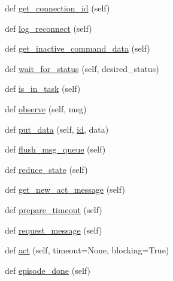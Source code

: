 \begin{DoxyCompactItemize}
\item 
def \hyperlink{classparlai_1_1mturk_1_1core_1_1agents_1_1MTurkAgent_a67b1c261cecdb746af6ce5d545db37ab}{get\+\_\+connection\+\_\+id} (self)
\item 
def \hyperlink{classparlai_1_1mturk_1_1core_1_1agents_1_1MTurkAgent_a989a5ebbfea27129167087af818e4f6d}{log\+\_\+reconnect} (self)
\item 
def \hyperlink{classparlai_1_1mturk_1_1core_1_1agents_1_1MTurkAgent_aa8b6eaf6532f10dabeb1ab8c3de98ec0}{get\+\_\+inactive\+\_\+command\+\_\+data} (self)
\item 
def \hyperlink{classparlai_1_1mturk_1_1core_1_1agents_1_1MTurkAgent_af1a00c6edfe78ac978c5bf97e88bdbe4}{wait\+\_\+for\+\_\+status} (self, desired\+\_\+status)
\item 
def \hyperlink{classparlai_1_1mturk_1_1core_1_1agents_1_1MTurkAgent_a2bf924f7dd6838441403e0045d9a0cd1}{is\+\_\+in\+\_\+task} (self)
\item 
def \hyperlink{classparlai_1_1mturk_1_1core_1_1agents_1_1MTurkAgent_a702f94fe519f05bc8fb9b382b818112c}{observe} (self, msg)
\item 
def \hyperlink{classparlai_1_1mturk_1_1core_1_1agents_1_1MTurkAgent_a99af17351b0e8dd9b8c091bda19bd9af}{put\+\_\+data} (self, \hyperlink{classparlai_1_1mturk_1_1core_1_1agents_1_1MTurkAgent_a88ae98b0e8133e9fff2475d09a6f2a81}{id}, data)
\item 
def \hyperlink{classparlai_1_1mturk_1_1core_1_1agents_1_1MTurkAgent_a7e522f68c78685e18b602f7579acce9d}{flush\+\_\+msg\+\_\+queue} (self)
\item 
def \hyperlink{classparlai_1_1mturk_1_1core_1_1agents_1_1MTurkAgent_aa5dd2f607442909921b3108b416460b3}{reduce\+\_\+state} (self)
\item 
def \hyperlink{classparlai_1_1mturk_1_1core_1_1agents_1_1MTurkAgent_a04758a4244229d4978a92573ec538883}{get\+\_\+new\+\_\+act\+\_\+message} (self)
\item 
def \hyperlink{classparlai_1_1mturk_1_1core_1_1agents_1_1MTurkAgent_a547ab71740a8dccd4a94150109876c9c}{prepare\+\_\+timeout} (self)
\item 
def \hyperlink{classparlai_1_1mturk_1_1core_1_1agents_1_1MTurkAgent_ade43480595cc2f6be96b5eb690e3128d}{request\+\_\+message} (self)
\item 
def \hyperlink{classparlai_1_1mturk_1_1core_1_1agents_1_1MTurkAgent_ace5f52c7d5532def64ed17737d2ce00c}{act} (self, timeout=None, blocking=True)
\item 
def \hyperlink{classparlai_1_1mturk_1_1core_1_1agents_1_1MTurkAgent_a9ab8c622bfe7d697d7cba94dc7c4b5a3}{episode\+\_\+done} (self)

\end{DoxyCompactItemize}
